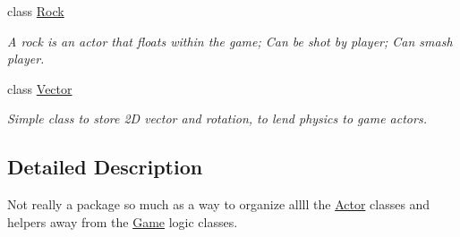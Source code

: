 \begin{DoxyCompactItemize}
class \hyperlink{classAsteroids_1_1Domain_1_1Game_1_1Actors_1_1Rock}{Rock}
\begin{DoxyCompactList}\small\item\em A rock is an actor that floats within the game; Can be shot by player; Can smash player. \end{DoxyCompactList}\item 
class \hyperlink{classAsteroids_1_1Domain_1_1Game_1_1Actors_1_1Vector}{Vector}
\begin{DoxyCompactList}\small\item\em Simple class to store 2D vector and rotation, to lend physics to game actors. \end{DoxyCompactList}\end{DoxyCompactItemize}


\subsection{Detailed Description}
Not really a package so much as a way to organize allll the \hyperlink{classAsteroids_1_1Domain_1_1Game_1_1Actors_1_1Actor}{Actor} classes and helpers away from the \hyperlink{classAsteroids_1_1Domain_1_1Game_1_1Game}{Game} logic classes. 